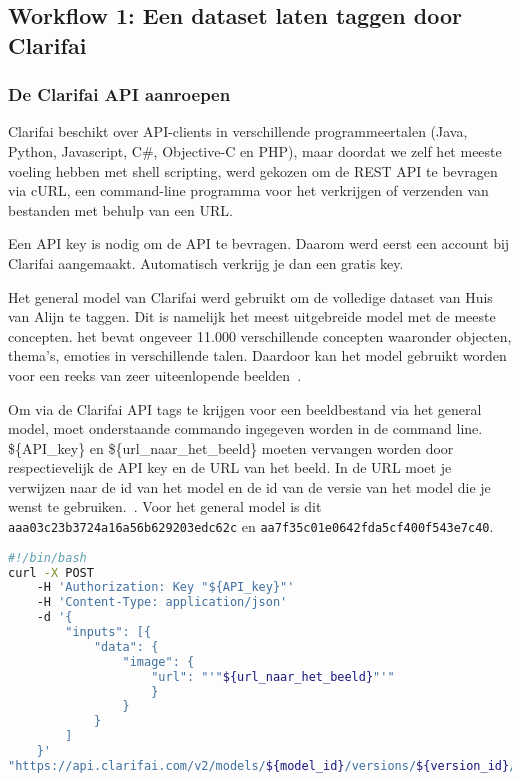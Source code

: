 \subsection{Workflow 1: Een dataset laten taggen door Clarifai}
\label{subsec:workflow1}

\subsubsection{De Clarifai API aanroepen}
\label{(subsubsec:clarifai-aanroepen)}

Clarifai beschikt over API-clients in verschillende programmeertalen (Java, Python, Javascript, C\#, Objective-C en PHP), maar doordat we zelf het meeste voeling hebben met shell scripting, werd gekozen om de REST API te bevragen via cURL, een command-line programma voor het verkrijgen of verzenden van bestanden met behulp van  een URL.

Een API key is nodig om de API te bevragen. Daarom werd eerst een account bij Clarifai aangemaakt. Automatisch verkrijg je dan een gratis key. 

Het general model van Clarifai werd gebruikt om de volledige dataset van Huis van Alijn te taggen. Dit is namelijk het meest uitgebreide model met de meeste concepten. het bevat ongeveer 11.000 verschillende concepten waaronder objecten, thema's, emoties in verschillende talen. Daardoor kan het model gebruikt worden voor een reeks van zeer uiteenlopende beelden~\autocite{ClarifaiGeneral}.

Om via de Clarifai API tags te krijgen voor een beeldbestand via het general model, moet onderstaande commando ingegeven worden in de command line. \$\{API\_key\} en \$\{url\_naar\_het\_beeld\} moeten vervangen worden door respectievelijk de API key en de URL van het beeld. In de URL moet je verwijzen naar de id van het model en de id van de versie van het model die je wenst te gebruiken.~\autocite{ClarifaiAPI}. Voor het general model is dit \texttt{aaa03c23b3724a16a56b629203edc62c} en \texttt{aa7f35c01e0642fda5cf400f543e7c40}.

\begin{lstlisting}[language=bash,caption=bash commando om een beeld door Clarifai te laten taggen.]
#!/bin/bash
curl -X POST
    -H 'Authorization: Key "${API_key}"'
    -H 'Content-Type: application/json'
    -d '{
        "inputs": [{
            "data": {
                "image": { 
                    "url": "'"${url_naar_het_beeld}"'"
                    }
                }
            }
        ]
    }'
"https://api.clarifai.com/v2/models/${model_id}/versions/${version_id}/outputs"
\end{lstlisting}

